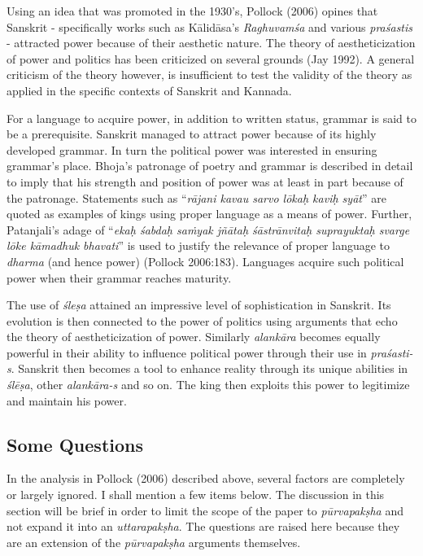 Using an idea that was promoted in the 1930’s, Pollock (2006) opines that Sanskrit - specifically works such as Kālidāsa’s {\sl Raghuvamśa} and various {\sl praśastis} - attracted power because of their aesthetic nature. The theory of aestheticization of power and politics has been criticized on several grounds (Jay 1992). A general criticism of the theory however, is insufficient to test the validity of the theory as applied in the specific contexts of Sanskrit and Kannada. 

For a language to acquire power, in addition to written status, grammar is said to be a prerequisite. Sanskrit managed to attract power because of its highly developed grammar. In turn the political power was interested in ensuring grammar’s place. Bhoja’s patronage of poetry and grammar is described in detail to imply that his strength and position of power was at least in part because of the patronage. Statements such as “{\sl rājani kavau sarvo lōkaḥ kaviḥ syāt}” are quoted as examples of kings using proper language as a means of power. Further, Patanjali’s adage of “{\sl ekaḥ śabdaḥ saṁyak jñātaḥ śāstrānvitaḥ suprayuktaḥ svarge lōke kāmadhuk bhavati}” is used to justify the relevance of proper language to {\sl dharma} (and hence power) (Pollock 2006:183). Languages acquire such political power when their grammar reaches maturity.

The use of {\sl śleṣa} attained an impressive level of sophistication in Sanskrit. Its evolution is then connected to the power of politics using arguments that echo the theory of aestheticization of power. Similarly {\sl alankāra} becomes equally powerful in their ability to influence political power through their use in {\sl praśasti-s}. Sanskrit then becomes a tool to enhance reality through its unique abilities in {\sl ślēṣa}, other {\sl alankāra-s} and so on. The king then exploits this power to legitimize and maintain his power.

\subsection{Some Questions}

In the analysis in Pollock (2006) described above, several factors are completely or largely ignored. I shall mention a few items below. The discussion in this section will be brief in order to limit the scope of the paper to {\sl pūrvapakṣha} and not expand it into an {\sl uttarapakṣha}. The questions are raised here because they are an extension of the {\sl pūrvapakṣha} arguments themselves. 

